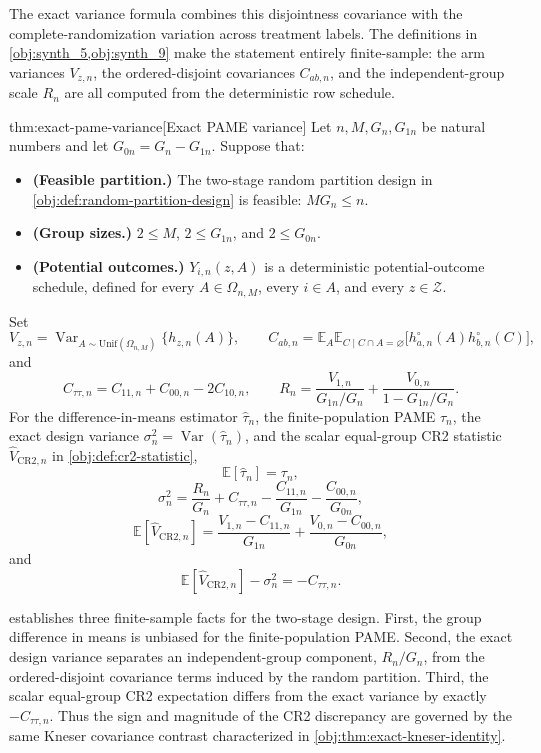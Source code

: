 The exact variance formula combines this disjointness covariance with the complete-randomization variation across treatment labels. The definitions in \cref{obj:synth_5,obj:synth_9} make the statement entirely finite-sample: the arm variances \(V_{z,n}\), the ordered-disjoint covariances \(C_{ab,n}\), and the independent-group scale \(R_n\) are all computed from the deterministic row schedule.

\begin{theoremv}{thm:exact-pame-variance}[Exact PAME variance]
Let \(n,M,G_n,G_{1n}\) be natural numbers and let \(G_{0n}=G_n-G_{1n}\). Suppose that:
\begin{itemize}
\item \textbf{(Feasible partition.)} The two-stage random partition design in \cref{obj:def:random-partition-design} is feasible: \(M G_n\le n\).
\item \textbf{(Group sizes.)} \(2\le M\), \(2\le G_{1n}\), and \(2\le G_{0n}\).
\item \textbf{(Potential outcomes.)} \(Y_{i,n}(z,A)\) is a deterministic potential-outcome schedule, defined for every \(A\in\Omega_{n,M}\), every \(i\in A\), and every \(z\in\mathcal Z\).
\end{itemize}
Set
\[
V_{z,n}
=
\operatorname{Var}_{A\sim\mathrm{Unif}(\Omega_{n,M})}\{h_{z,n}(A)\},
\qquad
C_{ab,n}
=
\mathbb E_{A}\mathbb E_{C\mid C\cap A=\varnothing}
\bigl[h_{a,n}^{\circ}(A)h_{b,n}^{\circ}(C)\bigr],
\]
and
\[
C_{\tau\tau,n}=C_{11,n}+C_{00,n}-2C_{10,n},
\qquad
R_n=\frac{V_{1,n}}{G_{1n}/G_n}+\frac{V_{0,n}}{1-G_{1n}/G_n}.
\]
For the difference-in-means estimator \(\widehat\tau_n\), the finite-population PAME \(\tau_n\), the exact design variance \(\sigma_n^2=\operatorname{Var}(\widehat\tau_n)\), and the scalar equal-group CR2 statistic \(\widehat V_{\mathrm{CR2},n}\) in \cref{obj:def:cr2-statistic},
\[
\mathbb E[\widehat\tau_n]=\tau_n,
\]
\[
\sigma_n^2
=
\frac{R_n}{G_n}
+
C_{\tau\tau,n}
-
\frac{C_{11,n}}{G_{1n}}
-
\frac{C_{00,n}}{G_{0n}},
\]
\[
\mathbb E[\widehat V_{\mathrm{CR2},n}]
=
\frac{V_{1,n}-C_{11,n}}{G_{1n}}
+
\frac{V_{0,n}-C_{00,n}}{G_{0n}},
\]
and
\[
\mathbb E[\widehat V_{\mathrm{CR2},n}]-\sigma_n^2=-C_{\tau\tau,n}.
\]
\end{theoremv}

 establishes three finite-sample facts for the two-stage design. First, the group difference in means is unbiased for the finite-population PAME. Second, the exact design variance separates an independent-group component, \(R_n/G_n\), from the ordered-disjoint covariance terms induced by the random partition. Third, the scalar equal-group CR2 expectation differs from the exact variance by exactly \(-C_{\tau\tau,n}\). Thus the sign and magnitude of the CR2 discrepancy are governed by the same Kneser covariance contrast characterized in \cref{obj:thm:exact-kneser-identity}.
